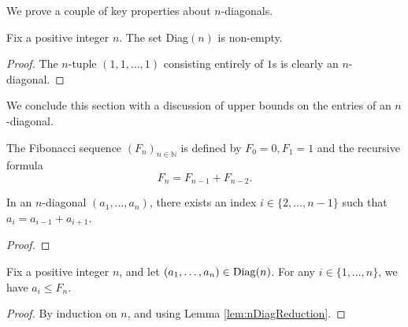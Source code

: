 We prove a couple of key properties about $n$-diagonals. 
\begin{lemma}
    \label{l:nDiagNonEmpty}
    Fix a positive integer $n$. The set Diag$(n)$ is non-empty.
\end{lemma}
\begin{proof}
    The $n$-tuple $(1,1,\ldots, 1)$ consisting entirely of $1$s is clearly an $n$-diagonal.
\end{proof}

We conclude this section with a discussion of upper bounds on the entries of an $n$-diagonal.
\begin{definition}
    \label{def:fib}
    The Fibonacci sequence $(F_n)_{n \in \mathbb{N}}$ is defined by $F_0 = 0, F_1 = 1$ and the recursive formula
    \[
        F_n = F_{n-1} + F_{n-2}.
    \]
\end{definition}

\begin{lemma}
    \label{lem:nDiagReduction}
    In an $n$-diagonal $(a_1, \ldots, a_n)$, there exists an index $i \in \{2,\ldots, n-1\}$ 
    such that $a_i = a_{i-1} + a_{i+1}$.
\end{lemma}
\begin{proof}

\end{proof}

\begin{proposition}
    \label{prop:nDiagFinite}
    Fix a positive integer $n$, and let $(a_1, \ldots, a_n) \in {\rm Diag}(n)$. 
    For any $i \in \{1,\ldots, n\}$, we have $a_i \leq F_n$. 
\end{proposition}
\begin{proof}
   By induction on $n$, and using Lemma \ref{lem:nDiagReduction}.
\end{proof}


